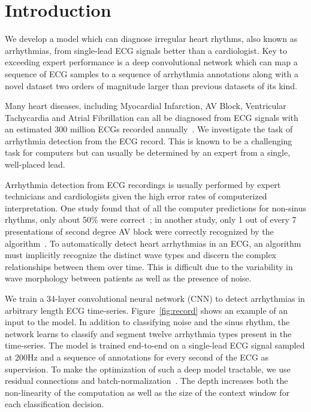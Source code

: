 \section{Introduction}
\label{sec:arrhythmias:intro}

We develop a model which can diagnose irregular heart rhythms, also known as
arrhythmias, from single-lead ECG signals better than a cardiologist. Key to
exceeding expert performance is a deep convolutional network which can map a
sequence of ECG samples to a sequence of arrhythmia annotations along with a
novel dataset two orders of magnitude larger than previous datasets of its
kind.

Many heart diseases, including Myocardial Infarction, AV Block, Ventricular
Tachycardia and Atrial Fibrillation can all be diagnosed from ECG signals with
an estimated 300 million ECGs recorded annually~\cite{heden1996detection}. We
investigate the task of arrhythmia detection from the ECG record. This is known
to be a challenging task for computers but can usually be determined by an
expert from a single, well-placed lead.

Arrhythmia detection from ECG recordings is usually performed by expert
technicians and cardiologists given the high error rates of computerized
interpretation.  One study found that of all the computer predictions for
non-sinus rhythms, only about 50\% were correct~\cite{shah2007errors}; in
another study, only 1 out of every 7 presentations of second degree AV block
were correctly recognized by the algorithm~\cite{guglin2006common}. To
automatically detect heart arrhythmias in an ECG, an algorithm must implicitly
recognize the distinct wave types and discern the complex relationships between
them over time. This is difficult due to the variability in wave morphology
between patients as well as the presence of noise.

We train a 34-layer convolutional neural network (CNN) to detect arrhythmias in
arbitrary length ECG time-series. Figure~\ref{fig:record} shows an example of
an input to the model. In addition to classifying noise and the sinus rhythm,
the network learns to classify and segment twelve arrhythmia types present in
the time-series. The model is trained end-to-end on a single-lead ECG signal
sampled at 200Hz and a sequence of annotations for every second of the ECG as
supervision. To make the optimization of such a deep model tractable, we use
residual connections and batch-normalization~\cite{he2016deep, ioffe2015batch}.
The depth increases both the non-linearity of the computation as well as the
size of the context window for each classification decision.

